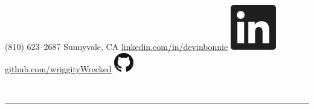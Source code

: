 \documentclass{article}
\begin{document}
{\begin{minipage}[t]{0.33\textwidth}
\begin{flushright}
                 \vspace{1px}
                \linebreak
                (810) 623--2687 \space\space \Telefon
                 \vspace{1px}
                \linebreak
                Sunnyvale, CA \space\space \Mundus
                 \vspace{1px}
                \linebreak
                \href{https://www.linkedin.com/in/devinbonnie}{linkedin.com/in/devinbonnie} \space\space \includegraphics[scale=0.40]{linkedin}\hspace{.9px}
                \linebreak
                \href{https://github.com/wriggityWrecked}{github.com/wriggityWrecked} \space\space \includegraphics[scale=0.225]{GitHub-Mark-32px}\hspace{1px}
                \linebreak
            \end{flushright}
        \end{minipage}
        \\
        \textcolor{lightGray}{\rule{542px}{0.4pt}}

        \setlength{\columnsep}{32.5px}
        \begin{multicols}{2}

\end{multicols}}
\end{document}
